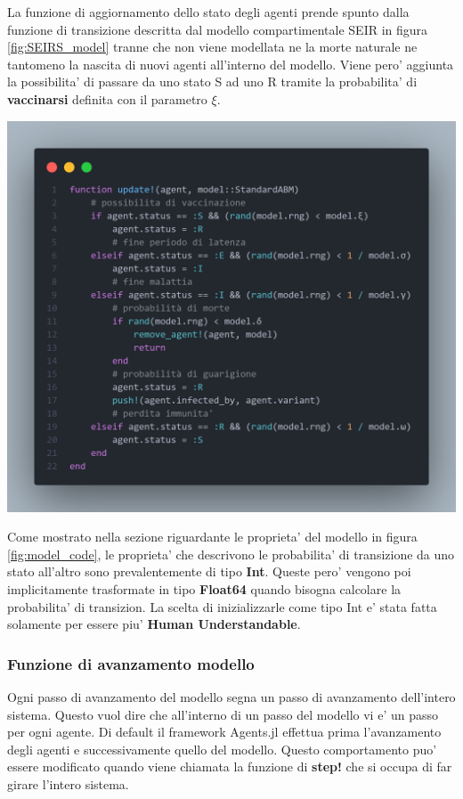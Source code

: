 La funzione di aggiornamento dello stato degli agenti prende spunto dalla 
funzione di transizione descritta dal modello compartimentale SEIR in figura \ref{fig:SEIRS_model}
tranne che non viene modellata ne la morte naturale ne tantomeno la nascita di nuovi 
agenti all'interno del modello. Viene pero' aggiunta la possibilita' di passare
da uno stato S ad uno R tramite la probabilita' di \textbf{vaccinarsi} definita con il parametro $\xi$.

\begin{minipage}{\linewidth}
	\centering
	\includegraphics[width=\textwidth]{img/update_function.png}
	\label{fig:update_agent_function}
\end{minipage}

Come mostrato nella sezione riguardante le proprieta' del modello in figura \ref{fig:model_code},
le proprieta' che descrivono le probabilita' di transizione da uno stato all'altro sono prevalentemente
di tipo \textbf{Int}. Queste pero' vengono poi implicitamente trasformate in tipo \textbf{Float64} 
quando bisogna calcolare la probabilita' di transizion. La scelta di inizializzarle come 
tipo Int e' stata fatta solamente per essere piu' \textbf{Human Understandable}.

\subsubsection*{Funzione di avanzamento modello}
Ogni passo di avanzamento del modello segna un passo di avanzamento dell'intero sistema. 
Questo vuol dire che all'interno di un passo del modello vi e' un passo per ogni agente. Di default
il framework Agents.jl effettua prima l'avanzamento degli agenti e successivamente quello del modello.
Questo comportamento puo' essere modificato quando viene chiamata la funzione di \textbf{step!} che 
si occupa di far girare l'intero sistema.

